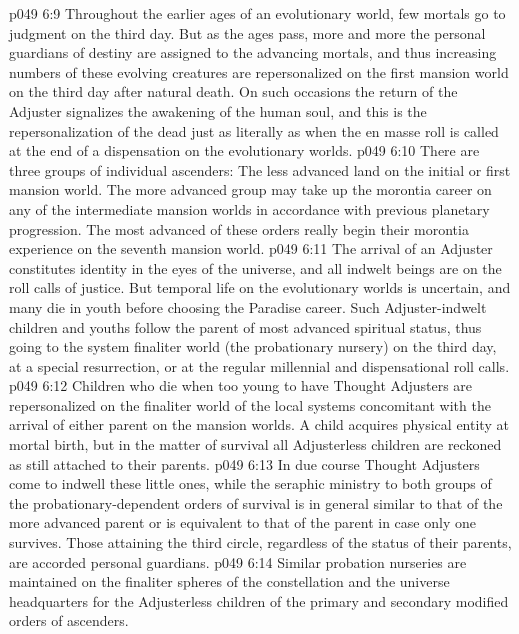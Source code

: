 \vs p049 6:9 Throughout the earlier ages of an evolutionary world, few mortals go to judgment on the third day. But as the ages pass, more and more the personal guardians of destiny are assigned to the advancing mortals, and thus increasing numbers of these evolving creatures are repersonalized on the first mansion world on the third day after natural death. On such occasions the return of the Adjuster signalizes the awakening of the human soul, and this is the repersonalization of the dead just as literally as when the en masse roll is called at the end of a dispensation on the evolutionary worlds.
\vs p049 6:10 There are three groups of individual ascenders: The less advanced land on the initial or first mansion world. The more advanced group may take up the morontia career on any of the intermediate mansion worlds in accordance with previous planetary progression. The most advanced of these orders really begin their morontia experience on the seventh mansion world.
\vs p049 6:11 \bibnobreakspace {} The arrival of an Adjuster constitutes identity in the eyes of the universe, and all indwelt beings are on the roll calls of justice. But temporal life on the evolutionary worlds is uncertain, and many die in youth before choosing the Paradise career. Such Adjuster\hyp{}indwelt children and youths follow the parent of most advanced spiritual status, thus going to the system finaliter world (the probationary nursery) on the third day, at a special resurrection, or at the regular millennial and dispensational roll calls.
\vs p049 6:12 Children who die when too young to have Thought Adjusters are repersonalized on the finaliter world of the local systems concomitant with the arrival of either parent on the mansion worlds. A child acquires physical entity at mortal birth, but in the matter of survival all Adjusterless children are reckoned as still attached to their parents.
\vs p049 6:13 In due course Thought Adjusters come to indwell these little ones, while the seraphic ministry to both groups of the probationary\hyp{}dependent orders of survival is in general similar to that of the more advanced parent or is equivalent to that of the parent in case only one survives. Those attaining the third circle, regardless of the status of their parents, are accorded personal guardians.
\vs p049 6:14 Similar probation nurseries are maintained on the finaliter spheres of the constellation and the universe headquarters for the Adjusterless children of the primary and secondary modified orders of ascenders.
